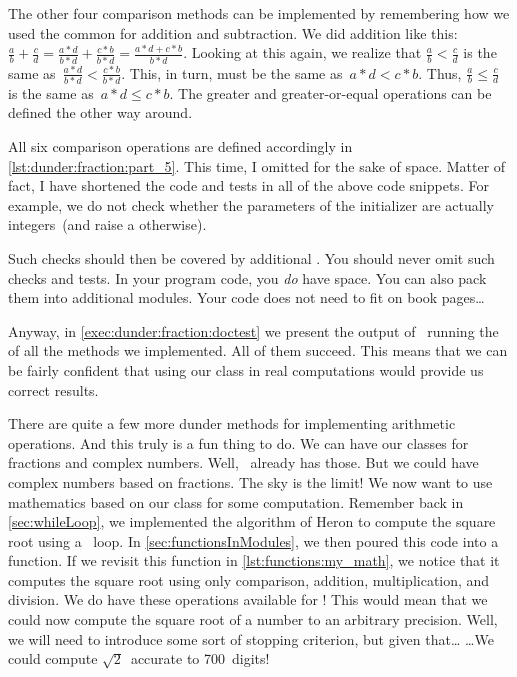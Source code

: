 The other four comparison methods can be implemented by remembering how we used the common  for addition and subtraction.
We did addition like this:~$\frac{a}{b}+\frac{c}{d}=\frac{a*d}{b*d}+\frac{c*b}{b*d}=\frac{a*d+c*b}{b*d}$.
Looking at this again, we realize that $\frac{a}{b}<\frac{c}{d}$ is the same as~$\frac{a*d}{b*d}<\frac{c*b}{b*d}$.
This, in turn, must be the same as~$a*d<c*b$.
Thus, $\frac{a}{b}\leq\frac{c}{d}$ is the same as~$a*d\leq c*b$.
The greater and greater-or-equal operations can be defined the other way around.

All six comparison operations are defined accordingly in \cref{lst:dunder:fraction:part_5}.
This time, I omitted  for the sake of space.
Matter of fact, I have shortened the code and tests in all of the above code snippets.
For example, we do not check whether the parameters of the initializer  are actually integers~(and raise a  otherwise).

Such checks should then be covered by additional .
You should never omit such checks and tests.
In your program code, you \emph{do} have space.
You can also pack them into additional modules.
Your code does not need to fit on book pages\dots

Anyway, in \cref{exec:dunder:fraction:doctest} we present the output of \pytest\ running the  of all the methods we implemented.
All of them succeed.
This means that we can be fairly confident that using our  class in real computations would provide us correct results.%

There are quite a few more dunder methods for implementing arithmetic operations.
And this truly is a fun thing to do.
We can have our classes for fractions and complex numbers.
Well, \python\ already has those.
But we could have complex numbers based on fractions.
The sky is the limit!%
\FloatBarrier%
\endhsection%
%
%
\label{sec:dunder:debugging}%
%
We now want to use mathematics based on our class  for some  computation.
Remember back in \cref{sec:whileLoop}, we implemented the algorithm of Heron to compute the square root using a ~loop.
In \cref{sec:functionsInModules}, we then poured this code into a function.
If we revisit this function  in \cref{lst:functions:my_math}, we notice that it computes the square root using only comparison, addition, multiplication, and division.
We do have these operations available for !
This would mean that we could now compute the square root of a number to an arbitrary precision.
Well, we will need to introduce some sort of stopping criterion, but given that{\dots}
{\dots}We could compute $\sqrt{2}$~accurate to 700~digits!

